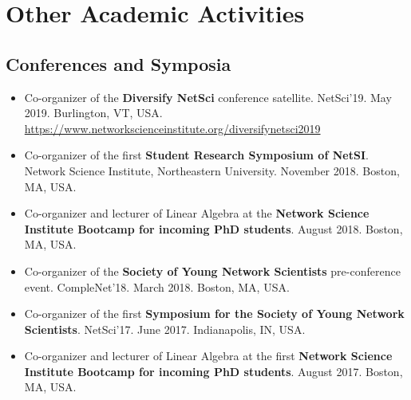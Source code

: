 \documentclass[12pt,]{scrartcl}
\begin{document}
\section{Other Academic Activities}\label{academic-activities}

\subsection{Conferences and Symposia}\label{conferences}

\begin{itemize}
\leftskip-0.25in

\item Co-organizer of the \textbf{Diversify NetSci} conference satellite. NetSci'19. May 2019. Burlington, VT, USA. \url{https://www.networkscienceinstitute.org/diversifynetsci2019}

\item Co-organizer of the first \textbf{Student Research Symposium of NetSI}. Network Science Institute, Northeastern University. November 2018. Boston, MA, USA. 

\item Co-organizer and lecturer of Linear Algebra at the \textbf{Network Science Institute Bootcamp for incoming PhD students}. August 2018. Boston, MA, USA.

\item Co-organizer of the \textbf{Society of Young Network Scientists} pre-conference event. CompleNet'18. March 2018. Boston, MA, USA.

\item Co-organizer of the first \textbf{Symposium for the Society of Young Network Scientists}. NetSci'17. June 2017. Indianapolis, IN, USA.

\item Co-organizer and lecturer of Linear Algebra at the first \textbf{Network Science Institute Bootcamp for incoming PhD students}. August 2017. Boston, MA, USA.

\end{itemize}
\end{document}
